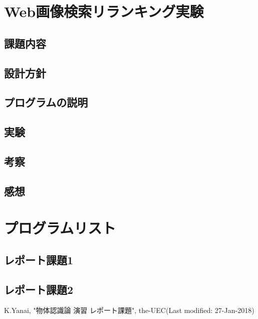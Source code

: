 \documentclass[11pt,a4paper, uplatex]{jsreport}
\begin{document}
\chapter{Web画像検索リランキング実験}
\section{課題内容}
\section{設計方針}
\section{プログラムの説明}
\section{実験}
\section{考察}
\section{感想}

\appendix
\chapter{プログラムリスト}
\section{レポート課題1}
\section{レポート課題2}
\begin{thebibliography}{数字}
   K.Yanai, "物体認識論 演習 レポート課題", the-UEC(Last modified: 27-Jan-2018)
\end{thebibliography}
\end{document}

